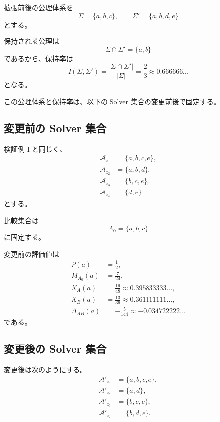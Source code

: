 \documentclass[a4paper,11pt]{ltjsarticle}
\begin{document}
拡張前後の公理体系を
\begin{equation}
  \Sigma=\{a,b,c\},\qquad
  \Sigma'=\{a,b,d,e\}
\end{equation}
とする。

保持される公理は
\begin{equation}
  \Sigma\cap\Sigma'=\{a,b\}
\end{equation}
であるから、保持率は
\begin{equation}
  I(\Sigma,\Sigma')
  =
  \frac{|\Sigma\cap\Sigma'|}{|\Sigma|}
  =\frac23
  \approx0.666666\ldots
\end{equation}
となる。

この公理体系と保持率は、以下の Solver 集合の変更前後で固定する。

\subsection{変更前の Solver 集合}

検証例 I と同じく、
\begin{align}
  \mathcal{A}_{z_1}&=\{a,b,c,e\},\\
  \mathcal{A}_{z_2}&=\{a,b,d\},\\
  \mathcal{A}_{z_3}&=\{b,c,e\},\\
  \mathcal{A}_{z_4}&=\{d,e\}
\end{align}
とする。

比較集合は
\begin{equation}
  A_0=\{a,b,c\}
\end{equation}
に固定する。

変更前の評価値は
\begin{align}
  P(a)&=\frac12,\\
  M_{A_0}(a)&=\frac7{24},\\
  K_A(a)&=\frac{19}{48}
    \approx0.395833333\ldots,\\
  K_B(a)&=\frac{13}{36}
    \approx0.361111111\ldots,\\
  \Delta_{AB}(a)&=-\frac5{144}
    \approx-0.034722222\ldots
\end{align}
である。

\subsection{変更後の Solver 集合}

変更後は次のようにする。
\begin{align}
  \mathcal{A}'_{z_1}&=\{a,b,c,e\},\\
  \mathcal{A}'_{z_2}&=\{a,d\},\\
  \mathcal{A}'_{z_3}&=\{b,c,e\},\\
  \mathcal{A}'_{z_4}&=\{b,d,e\}.
\end{align}
\end{document}
